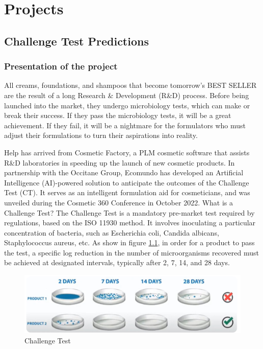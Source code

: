 \documentclass[a4paper,12pt,twoside]{report}
\begin{document}
\chapter{Projects}
\thispagestyle{empty}
\section{Challenge Test Predictions}
\subsection{Presentation of the project}
All creams, foundations, and shampoos that become tomorrow's BEST SELLER are the result of a long Research \& Development (R\&D) process. Before being launched into the market, they undergo microbiology tests, which can make or break their success. If they pass the microbiology tests, it will be a great achievement. If they fail, it will be a nightmare for the formulators who must adjust their formulations to turn their aspirations into reality.

Help has arrived from Cosmetic Factory, a PLM cosmetic software that assists R\&D laboratories in speeding up the launch of new cosmetic products. In partnership with the Occitane Group, Ecomundo has developed an Artificial Intelligence (AI)-powered solution to anticipate the outcomes of the Challenge Test (CT). It serves as an intelligent formulation aid for cosmeticians, and was unveiled during the Cosmetic 360 Conference in October 2022. 
What is a Challenge Test? The Challenge Test is a mandatory pre-market test required by regulations, based on the ISO 11930 method. It involves inoculating a particular concentration of bacteria, such as Escherichia coli, Candida albicans, Staphylococcus aureus, etc. As show in figure \ref{challengetest}, in order for a product to pass the test, a specific log reduction in the number of microorganisms recovered must be achieved at designated intervals, typically after 2, 7, 14, and 28 days.
\begin{figure}[H]
		\includegraphics[width=\textwidth]{images/CT}
	\caption[Challenge Test]{Challenge Test}
	\label{challengetest}
\end{figure}
\end{document}
